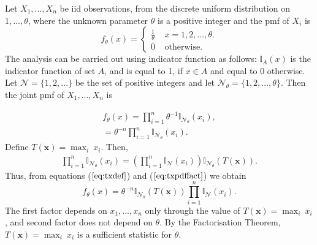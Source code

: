 \documentclass[a4paper,english,12pt]{article}
\newcommand{\bx}{\mathbf{x}}
\begin{document}
\begin{exmp}
Let $X_1,...,X_n$ be iid observations, from the discrete uniform distribution on $1,...,\theta$, where the unknown parameter $\theta$ is a positive integer and the pmf of $X_i$ is
\begin{equation*}
f_\theta(x) = 
\begin{cases} 
\frac{1}{\theta} ~~~~~ x=1,2,...,\theta. \\
0 ~~~~~\text{otherwise}.
\end{cases}
\end{equation*}
The analysis can be carried out using indicator function as follows:
$\mathbb{I}_A(x)$ is the indicator function of set $A$, and is equal to 1, if $x \in A$ and equal to 0 otherwise. Let $\mathcal{N} = \{1,2,...\}$ be the set of positive integers and let $\mathcal{N}_\theta =\{1,2,...,\theta \}$. Then the joint pmf of $X_1,...,X_n$ is 

\begin{eqnarray}
f_\theta(x) = \prod_{i=1}^{n}{\theta^{-1}\mathbb{I}_{\mathcal{N}_\theta} (x_i)}, \nonumber \\
= \theta^{-n}\prod_{i=1}^{n}{\mathbb{I}_{\mathcal{N}_\theta} (x_i)}.  \label{eq:txdef}
\end{eqnarray}
Define $T(\bx)=\displaystyle\max_i ~x_i$. Then,
\begin{eqnarray}
\prod_{i=1}^{n}{\mathbb{I}_{\mathcal{N}_\theta} (x_i)}=\left(\prod_{i=1}^{n}{\mathbb{I}_{\mathcal{N}} (x_i)}\right)\mathbb{I}_{\mathcal{N}_\theta} (T(\bx)). \label{eq:txpdffact}
\end{eqnarray}
Thus, from equations ($ \ref{eq:txdef} $) and ($ \ref{eq:txpdffact} $) we obtain
\begin{equation}
f_\theta(x) = \theta^{-n}\mathbb{I}_{\mathcal{N}_\theta} (T(\bx))\prod_{i=1}^{n}{\mathbb{I}_{\mathcal{N}} (x_i)}.  
\end{equation}
The first factor depends on $x_1,...,x_n$ only through the value of $T(\bx)=\displaystyle\max_i ~x_i$, and second factor does not depend on $\theta$. By the Factorisation Theorem, $T(\bx)=\displaystyle\max_i ~x_i$ is a sufficient statistic for $\theta$.

\end{exmp}
\end{document}
